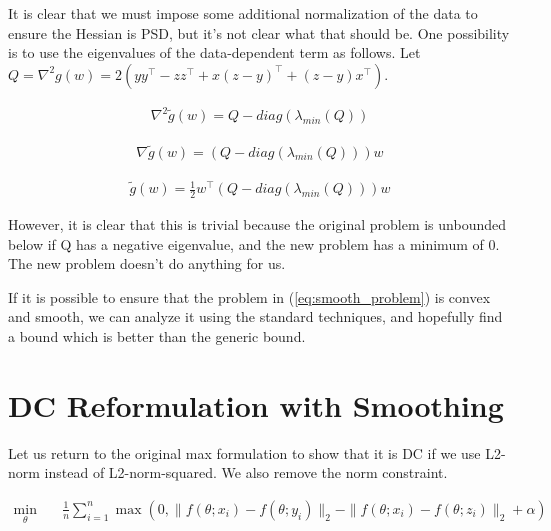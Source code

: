 \documentclass[11pt]{article}
\begin{document}
It is clear that we must impose some additional normalization of the data to ensure the Hessian is PSD, but it's not clear what that should be. One possibility is to use the eigenvalues of the data-dependent term as follows. Let $Q = \nabla^2 g(w) = 2(yy^{\top} - zz^{\top} + x(z - y)^{\top} + (z - y)x^{\top})$. 

\begin{equation}
\begin{aligned}
\nabla^2 \tilde{g}(w) = Q - diag(\lambda_{min}(Q))
\end{aligned}
\end{equation}

\begin{equation}
\begin{aligned}
\nabla \tilde{g}(w) = (Q - diag(\lambda_{min}(Q)))w
\end{aligned}
\end{equation}

\begin{equation}
\begin{aligned}
\tilde{g}(w) = \frac{1}{2}w^{\top}(Q - diag(\lambda_{min}(Q)))w
\end{aligned}
\end{equation}

However, it is clear that this is trivial because the original problem is unbounded below if Q has a negative eigenvalue, and the new problem has a minimum of 0. The new problem doesn't do anything for us.

If it is possible to ensure that the problem in (\ref{eq:smooth_problem}) is convex and smooth, we can analyze it using the standard techniques, and hopefully find a bound which is better than the generic bound.

\section{DC Reformulation with Smoothing}

Let us return to the original max formulation to show that it is DC if we use L2-norm instead of L2-norm-squared. We also remove the norm constraint.

\begin{equation}
\begin{aligned}
    \min_{\theta} \quad & \frac{1}{n} \sum_{i=1}^{n} \max(0, \| f(\theta; x_i) - f(\theta; y_i)\|_2 - \| f(\theta; x_i) - f(\theta; z_i)\|_2 + \alpha)
\end{aligned}
\end{equation}
\end{document}
